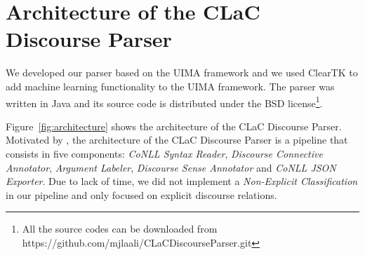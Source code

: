 \documentclass[11pt]{article}
\begin{document}



\section{Architecture of the CLaC Discourse Parser}
\label{sec:architecture}

We developed our parser based on the UIMA framework \cite{ferrucci04} and we used ClearTK \cite{bethard14} to add machine learning functionality to the UIMA framework. The parser was written in Java and its source code is distributed under the BSD license\footnote{All the source codes can be downloaded from https://github.com/mjlaali/CLaCDiscourseParser.git}. 


Figure~\ref{fig:architecture} shows the architecture of the CLaC Discourse Parser. Motivated by , the architecture of the CLaC Discourse Parser is a pipeline that consists in five components: \textit{CoNLL Syntax Reader}, \textit{Discourse Connective Annotator}, \textit{Argument Labeler}, \textit{Discourse Sense Annotator} and \textit{CoNLL JSON Exporter}. Due to lack of time, we did not implement a \textit{Non-Explicit Classification} in our pipeline and only focused on explicit discourse relations. 
\end{document}

